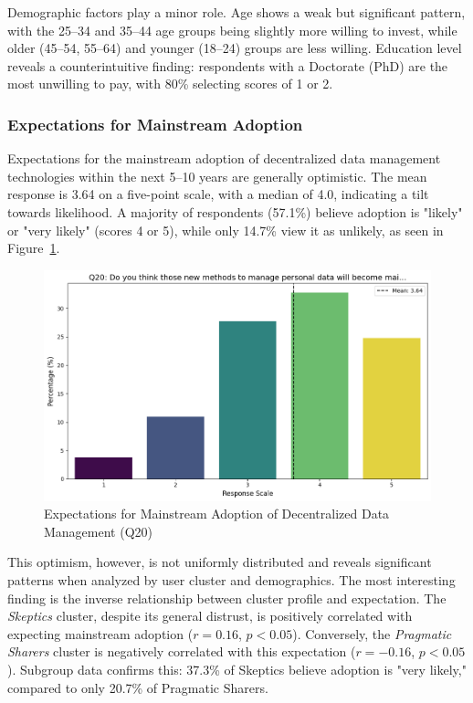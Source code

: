 	Demographic factors play a minor role. Age shows a weak but significant pattern, with the 25--34 and 35--44 age groups being slightly more willing to invest, while older (45--54, 55--64) and younger (18--24) groups are less willing. Education level reveals a counterintuitive finding: respondents with a Doctorate (PhD) are the most unwilling to pay, with 80\% selecting scores of 1 or 2.		
	\subsubsection{Expectations for Mainstream Adoption}
		Expectations for the mainstream adoption of decentralized data management technologies within the next 5–10 years are generally optimistic. The mean response is 3.64 on a five-point scale, with a median of 4.0, indicating a tilt towards likelihood. A majority of respondents (57.1\%) believe adoption is "likely" or "very likely" (scores 4 or 5), while only 14.7\% view it as unlikely, as seen in Figure~\ref{fig:mainstream_adoption_expectation}. 
		\begin{figure}[ht]\centering
			\includegraphics[width=1\linewidth]{figures/questions/Q20_likert.png}
			\caption{Expectations for Mainstream Adoption of Decentralized Data Management (Q20)}
			\label{fig:mainstream_adoption_expectation}
		\end{figure}
		This optimism, however, is not uniformly distributed and reveals significant patterns when analyzed by user cluster and demographics. The most interesting finding is the inverse relationship between cluster profile and expectation. The \textit{Skeptics} cluster, despite its general distrust, is positively correlated with expecting mainstream adoption ($r = 0.16$, $p < 0.05$). Conversely, the \textit{Pragmatic Sharers} cluster is negatively correlated with this expectation ($r = -0.16$, $p < 0.05$). Subgroup data confirms this: 37.3\% of Skeptics believe adoption is "very likely," compared to only 20.7\% of Pragmatic Sharers.
